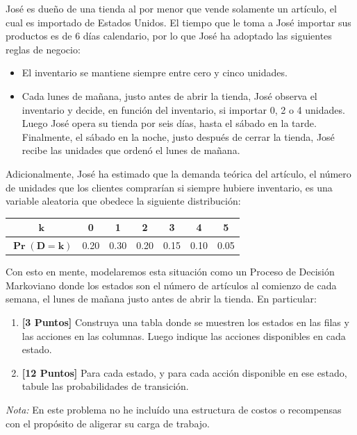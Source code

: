 \documentclass[ a4paper, twoside, 11pt]{article}
\begin{document}
\begin{problem}
Jos\'e es due\~no de una tienda al por menor que vende solamente un art\'iculo, el cual es importado de Estados Unidos. El tiempo que le toma a Jos\'e importar sus productos es de 6 d\'ias calendario, por lo que Jos\'e ha adoptado las siguientes reglas de negocio: 
\begin{itemize}
\item El inventario se mantiene siempre entre cero y cinco unidades. 
\item Cada lunes de ma\~nana, justo antes de abrir la tienda, Jos\'e observa el inventario y decide, en funci\'on del inventario, si importar 0, 2 o 4 unidades. Luego Jos\'e opera su tienda por seis d\'ias, hasta el s\'abado en la tarde. Finalmente, el s\'abado en la noche, justo despu\'es de cerrar la tienda, Jos\'e recibe las unidades que orden\'o el lunes de ma\~nana. 
\end{itemize}
Adicionalmente, Jos\'e ha estimado que la demanda te\'orica del art\'iculo, \ie el n\'umero de unidades que los clientes comprar\'ian si siempre hubiere inventario, es una variable aleatoria que obedece la siguiente distribuci\'on: 
\begin{table}[H]
\centering
\begin{tabular}{|c|c|c|c|c|c|c|}
\hline
$\boldsymbol{k}$ & 0 & 1 & 2 & 3 & 4 & 5 \\ \hline
$\boldsymbol{\Pr( D = k )}$ & 0.20 & 0.30 & 0.20 & 0.15 & 0.10 & 0.05 \\ \hline
\end{tabular}
\end{table}

Con esto en mente, modelaremos esta situaci\'on como un Proceso de Decisi\'on Markoviano donde los estados son el n\'umero de art\'iculos al comienzo de cada semana, \ie el lunes de ma\~nana justo antes de abrir la tienda. En particular: 
\begin{enumerate}[label=\textbf{\alph*)}]
\item \textbf{[3 Puntos]} Construya una tabla donde se muestren los estados en las filas y las acciones en las columnas. Luego indique las acciones disponibles en cada estado. 
\item \textbf{[12 Puntos]} Para cada estado, y para cada acci\'on disponible en ese estado, tabule las probabilidades de transici\'on. 
\end{enumerate}

\emph{Nota:} En este problema no he inclu\'ido una estructura de costos o recompensas con el prop\'osito de aligerar su carga de trabajo. 

\QED

\end{problem}
\fullskip
\end{document}
